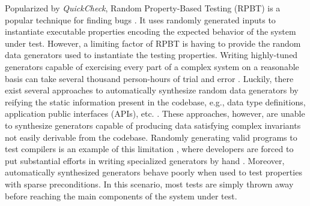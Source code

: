 \documentclass[sigconf,review,anonymous]{acmart}
\newcommand{\quickcheck}{\textit{QuickCheck}\xspace}
\begin{document}
%
Popularized by \quickcheck \cite{ClaessenH00}, Random Property-Based Testing
(RPBT) is a popular technique for finding bugs
\cite{ClaessenH00,hughes2003erlang, papadakis2011proper, bulwahn2012new,
  denes2014quickchick}.
%
It uses randomly generated inputs to instantiate executable properties encoding
the expected behavior of the system under test.
%
%
%
However, a limiting factor of RPBT is having to provide the random data
generators used to instantiate the testing properties. 
%
Writing highly-tuned generators capable of exercising every part of a complex
system on a reasonable basis can take several thousand person-hours of trial and
error \cite{lampropoulos2019coverage}.
%
Luckily, there exist several approaches to automatically synthesize random data
generators by reifying the static information present in the codebase, e.g.,
data type definitions, application public interfaces (APIs), etc.
\cite{GriecoCB16, DBLP:conf/haskell/MistaRH18, Mista2019GeneratingRS,
DuregardJW12, Lampropoulos2017, Bendkowski2017}.
%
These approaches, however, are unable to synthesize generators capable of
producing data satisfying complex invariants not easily derivable from the
codebase.
%
Randomly generating valid programs to test compilers is an example of this
limitation \cite{chen2020asurvey}, where developers are forced to put
substantial efforts in writing specialized generators by hand \cite{Palka11,
perenyi2020stack, yang2011finding}.
%
Moreover, automatically synthesized generators behave poorly when used to test
properties with sparse preconditions.
%
In this scenario, most tests are simply thrown away before reaching the main
components of the system under test.
\end{document}
